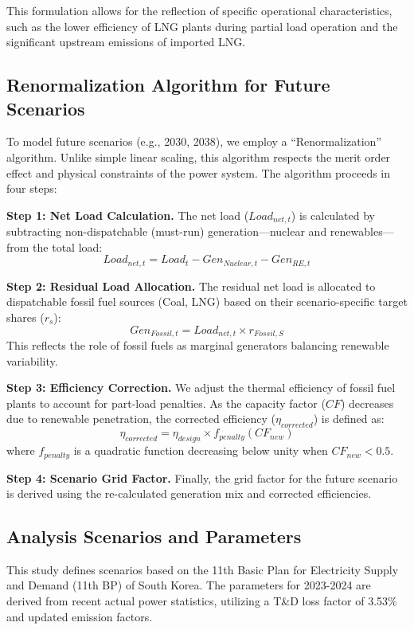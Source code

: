 \documentclass[final,5p,times,twocolumn,authoryear]{elsarticle}
\begin{document}
This formulation allows for the reflection of specific operational characteristics, such as the lower efficiency of LNG plants during partial load operation and the significant upstream emissions of imported LNG.

\subsection{Renormalization Algorithm for Future Scenarios}
To model future scenarios (e.g., 2030, 2038), we employ a ``Renormalization'' algorithm. Unlike simple linear scaling, this algorithm respects the merit order effect and physical constraints of the power system.
The algorithm proceeds in four steps:

\textbf{Step 1: Net Load Calculation.}
The net load ($Load_{net, t}$) is calculated by subtracting non-dispatchable (must-run) generation—nuclear and renewables—from the total load:
\begin{equation}
Load_{net, t} = Load_{t} - Gen_{Nuclear, t} - Gen_{RE, t}
\end{equation}

\textbf{Step 2: Residual Load Allocation.}
The residual net load is allocated to dispatchable fossil fuel sources (Coal, LNG) based on their scenario-specific target shares ($r_{s}$):
\begin{equation}
Gen_{Fossil, t} = Load_{net, t} \times r_{Fossil, S}
\end{equation}
This reflects the role of fossil fuels as marginal generators balancing renewable variability.

\textbf{Step 3: Efficiency Correction.}
We adjust the thermal efficiency of fossil fuel plants to account for part-load penalties. As the capacity factor ($CF$) decreases due to renewable penetration, the corrected efficiency ($\eta_{corrected}$) is defined as:
\begin{equation}
\eta_{corrected} = \eta_{design} \times f_{penalty}(CF_{new})
\end{equation}
where $f_{penalty}$ is a quadratic function decreasing below unity when $CF_{new} < 0.5$.

\textbf{Step 4: Scenario Grid Factor.}
Finally, the grid factor for the future scenario is derived using the re-calculated generation mix and corrected efficiencies.

\subsection{Analysis Scenarios and Parameters}
This study defines scenarios based on the 11th Basic Plan for Electricity Supply and Demand (11th BP) of South Korea. The parameters for 2023-2024 are derived from recent actual power statistics, utilizing a T\&D loss factor of 3.53\% and updated emission factors.
\end{document}
